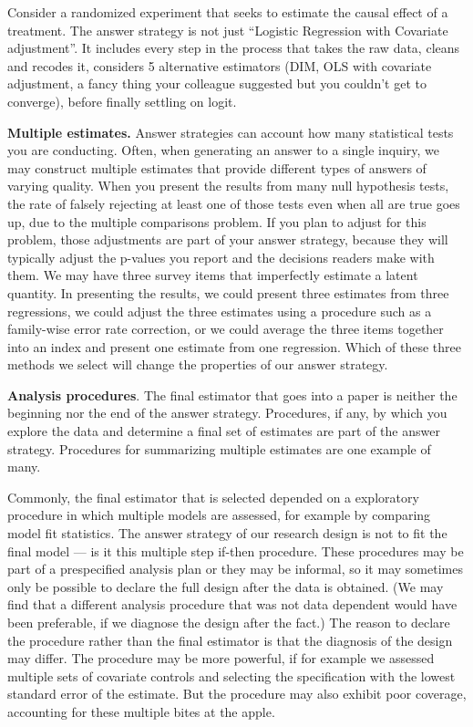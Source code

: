 \documentclass[
]{article}
\begin{document}
Consider a randomized experiment that seeks to estimate the causal
effect of a treatment. The answer strategy is not just ``Logistic
Regression with Covariate adjustment''. It includes every step in the
process that takes the raw data, cleans and recodes it, considers 5
alternative estimators (DIM, OLS with covariate adjustment, a fancy
thing your colleague suggested but you couldn't get to converge), before
finally settling on logit.

\textbf{Multiple estimates.} Answer strategies can account how many
statistical tests you are conducting. Often, when generating an answer
to a single inquiry, we may construct multiple estimates that provide
different types of answers of varying quality. When you present the
results from many null hypothesis tests, the rate of falsely rejecting
at least one of those tests even when all are true goes up, due to the
multiple comparisons problem. If you plan to adjust for this problem,
those adjustments are part of your answer strategy, because they will
typically adjust the p-values you report and the decisions readers make
with them. We may have three survey items that imperfectly estimate a
latent quantity. In presenting the results, we could present three
estimates from three regressions, we could adjust the three estimates
using a procedure such as a family-wise error rate correction, or we
could average the three items together into an index and present one
estimate from one regression. Which of these three methods we select
will change the properties of our answer strategy.

\textbf{Analysis procedures}. The final estimator that goes into a paper
is neither the beginning nor the end of the answer strategy. Procedures,
if any, by which you explore the data and determine a final set of
estimates are part of the answer strategy. Procedures for summarizing
multiple estimates are one example of many.

Commonly, the final estimator that is selected depended on a exploratory
procedure in which multiple models are assessed, for example by
comparing model fit statistics. The answer strategy of our research
design is not to fit the final model --- is it this multiple step
if-then procedure. These procedures may be part of a prespecified
analysis plan or they may be informal, so it may sometimes only be
possible to declare the full design after the data is obtained. (We may
find that a different analysis procedure that was not data dependent
would have been preferable, if we diagnose the design after the fact.)
The reason to declare the procedure rather than the final estimator is
that the diagnosis of the design may differ. The procedure may be more
powerful, if for example we assessed multiple sets of covariate controls
and selecting the specification with the lowest standard error of the
estimate. But the procedure may also exhibit poor coverage, accounting
for these multiple bites at the apple.
\end{document}
